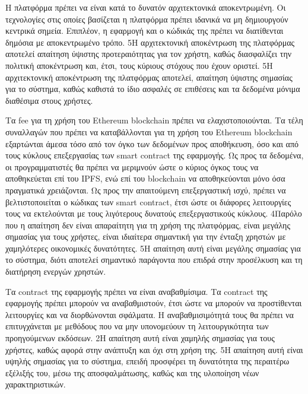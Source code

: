 \begin{enumerate}[label=\textbf{<ΜΛΑ-\arabic*>}, leftmargin=\parindent, align=left, labelwidth=\parindent, labelsep=0pt]
	\sysReqItem
		{\label{srs:non-functional-srs-maximum-decentraliztion}}
		{Η πλατφόρμα πρέπει να είναι κατά το δυνατόν αρχιτεκτονικά αποκεντρωμένη.}
		{Οι τεχνολογίες στις οποίες βασίζεται η πλατφόρμα πρέπει ιδανικά να μη δημιουργούν κεντρικά σημεία. Επιπλέον, η εφαρμογή και ο κώδικάς της πρέπει να διατίθενται δημόσια με αποκεντρωμένο τρόπο.}
		{5}{Η αρχιτεκτονική αποκέντρωση της πλατφόρμας αποτελεί απαίτηση ύψιστης προτεραιότητας για τον χρήστη, καθώς διασφαλίζει την πολιτική αποκέντρωση και, έτσι, τους κύριους στόχους που έχουν οριστεί.}
		{5}{Η αρχιτεκτονική αποκέντρωση της πλατφόρμας αποτελεί, απαίτηση ύψιστης σημασίας για το σύστημα, καθώς καθιστά το ίδιο ασφαλές σε επιθέσεις και τα δεδομένα μόνιμα διαθέσιμα στους χρήστες.}

	\sysReqItem
		{\label{srs:non-functional-srs-minimize-fees}}
		{Τα fee για τη χρήση του Ethereum blockchain πρέπει να ελαχιστοποιούνται.}
		{Τα τέλη συναλλαγών που πρέπει να καταβάλλονται για τη χρήση του Ethereum blockchain εξαρτώνται άμεσα τόσο από τον όγκο των δεδομένων προς αποθήκευση, όσο και από τους κύκλους επεξεργασίας των smart contract της εφαρμογής. Ως προς τα δεδομένα, οι προγραμματιστές θα πρέπει να μεριμνούν ώστε ο κύριος όγκος τους να αποθηκεύεται επί του IPFS, ενώ επί του blockchain να αποθηκεύονται μόνο όσα πραγματικά χρειάζονται. Ως προς την απαιτούμενη επεξεργαστική ισχύ, πρέπει να βελτιστοποιείται ο κώδικας των smart contract, έτσι ώστε οι διάφορες λειτουργίες τους να εκτελούνται με τους λιγότερους δυνατούς επεξεργαστικούς κύκλους.}
		{4}{Παρόλο που η απαίτηση δεν είναι απαραίτητη για τη χρήση της πλατφόρμας, είναι μεγάλης σημασίας για τους χρήστες, είναι ιδιαίτερα σημαντική για την ένταξη χρηστών με χαμηλότερες οικονομικές δυνατότητες.}
		{5}{Η απαίτηση αυτή είναι μεγάλης σημασίας για το σύστημα, διότι αποτελεί σημαντικό παράγοντα που επιδρά στην προσέλκυση και τη διατήρηση ενεργών χρηστών.}

	\sysReqItem
		{\label{srs:non-functional-srs-upgrade-contracts}}
		{Τα contract της εφαρμογής πρέπει να είναι αναβαθμίσιμα.}
		{Τα contract της εφαρμογής πρέπει μπορούν να αναβαθμιστούν, έτσι ώστε να μπορούν να προστίθενται λειτουργίες και να διορθώνονται σφάλματα. Η αναβαθμισιμότητά τους θα πρέπει να επιτυγχάνεται με μεθόδους που να μην υπονομεύουν τη λειτουργικότητα των  προηγούμενων εκδόσεων.}
		{2}{Η απαίτηση αυτή είναι χαμηλής σημασίας για τους χρήστες, καθώς αφορά στην ανάπτυξη και όχι στη χρήση της.}
		{5}{Η απαίτηση αυτή είναι υψηλής σημασίας για το σύστημα, επειδή προσφέρει τη δυνατότητα της περαιτέρω εξέλιξής του, μέσω της αποσφαλμάτωσης, καθώς και της υλοποίηση νέων χαρακτηριστικών.}
\end{enumerate}
